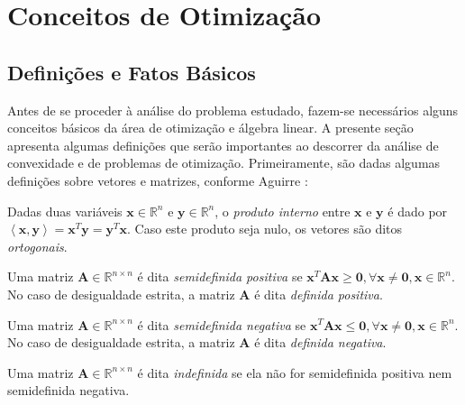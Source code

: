 
\section{Conceitos de Otimiza\c{c}\~{a}o}\label{subsec:otimconcepts}

\subsection{Defini\c{c}\~{o}es e Fatos B\'{a}sicos}
Antes de se proceder \`{a} an\'{a}lise do problema estudado, fazem-se necess\'{a}rios alguns conceitos b\'{a}sicos da \'{a}rea de otimiza\c{c}\~{a}o e \'{a}lgebra linear. A presente se\c{c}\~{a}o apresenta algumas defini\c{c}\~{o}es que ser\~{a}o importantes ao descorrer da an\'{a}lise de convexidade e de problemas de otimiza\c{c}\~{a}o. Primeiramente, s\~{a}o dadas algumas defini\c{c}\~{o}es sobre vetores e matrizes, conforme Aguirre \cite{aguirre}:
\begin{definition}\label{dotProd}
Dadas duas vari\'{a}veis $\mathbf{x} \in \mathbb{R}^{n}$ e $\mathbf{y} \in \mathbb{R}^{n}$, o \textit{produto interno} entre $\mathbf{x}$ e $\mathbf{y}$ \'{e} dado por $\left\langle \mathbf{x},\mathbf{y}\right\rangle = \mathbf{x}^{T}\mathbf{y} = \mathbf{y}^{T}\mathbf{x}$. Caso este produto seja nulo, os vetores s\~{a}o ditos \textit{ortogonais}.
\end{definition}
\begin{definition}
Uma matriz $\mathbf{A} \in \mathbb{R}^{n \times n}$ \'{e} dita \textit{semidefinida positiva} se $\mathbf{x}^{T}\mathbf{A}\mathbf{x} \ge \mathbf{0}, \forall\mathbf{x} \ne \mathbf{0}, \mathbf{x} \in \mathbb{R}^{n}$. No caso de desigualdade estrita, a matriz $\mathbf{A}$ \'{e} dita \textit{definida positiva}. 
\end{definition}

\begin{definition}
Uma matriz $\mathbf{A} \in \mathbb{R}^{n \times n}$ \'{e} dita \textit{semidefinida negativa} se $\mathbf{x}^{T}\mathbf{A}\mathbf{x} \le \mathbf{0}, \forall\mathbf{x} \ne \mathbf{0}, \mathbf{x} \in \mathbb{R}^{n}$. No caso de desigualdade estrita, a matriz $\mathbf{A}$ \'{e} dita \textit{definida negativa}. 
\end{definition}

\begin{definition}
Uma matriz $\mathbf{A} \in \mathbb{R}^{n \times n}$ \'{e} dita \textit{indefinida} se ela n\~{a}o for semidefinida positiva nem semidefinida negativa.
\end{definition}

